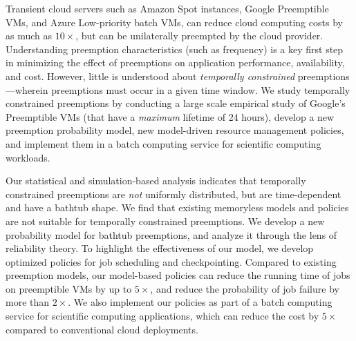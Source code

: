 Transient cloud servers such as Amazon Spot instances, Google
Preemptible VMs, and Azure Low-priority batch VMs, can reduce cloud
computing costs by as much as $10\times$, but can be unilaterally
preempted by the cloud provider.  Understanding preemption
characteristics (such as frequency) is a key first step in minimizing
the effect of preemptions on application performance, availability,
and cost.  However, little is understood about \emph{temporally
  constrained} preemptions---wherein preemptions must occur in a given
time window.  We study temporally constrained preemptions by
conducting a large scale empirical study of Google's Preemptible VMs
(that have a \emph{maximum} lifetime of 24 hours), develop a new
preemption probability model, new model-driven resource management
policies, and implement them in a batch computing service for
scientific computing workloads.

Our statistical and simulation-based analysis indicates that
temporally constrained preemptions are \emph{not} uniformly
distributed, but are time-dependent and have a bathtub shape.  We find
that existing memoryless models and policies are not suitable for
temporally constrained preemptions.  We develop a new probability
model for bathtub preemptions, and analyze it through the lens of
reliability theory.  To highlight the effectiveness of our model, we
develop optimized policies for job scheduling and checkpointing.
Compared to existing preemption models, our model-based policies can
reduce the running time of jobs on preemptible VMs by up to $5\times$,
and reduce the probability of job failure by more than $2\times$.  We
also implement our policies as part of a batch computing service for
scientific computing applications, which can reduce the cost by
$5\times$ compared to conventional cloud deployments.







